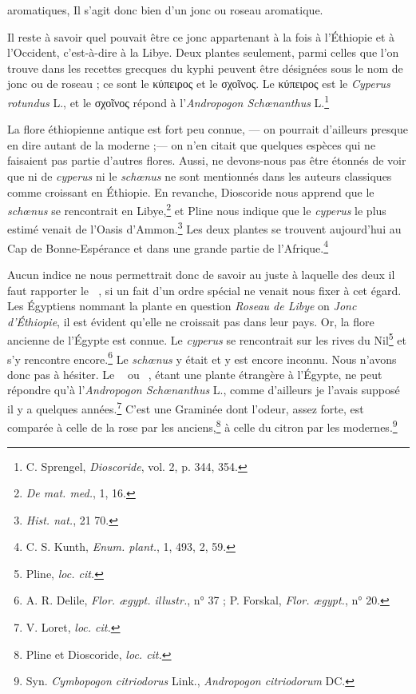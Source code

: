 \documentclass[a4paper, 11pt, oneside, landscape]{article}
\newcommand*\hieroAACM{}
\newcommand*\hieroAAFN{}
\newcommand*\hieroAAFO{\raisebox{0.5ex}{}}
\newcommand*\hieroAAHQ{}
\newcommand*\hieroAAHR{}
\newcommand*\hieroAAUY{}
\begin{document}
aromatiques, Il s'agit donc bien d'un jonc ou roseau aromatique.

Il reste à savoir quel pouvait être ce jonc appartenant à la fois à l'Éthiopie et à l'Occident, c'est-à-dire à la Libye. Deux plantes seulement, parmi celles que l'on trouve dans les recettes grecques du kyphi peuvent être désignées sous le nom de jonc ou de roseau ; ce sont le κύπειρος et le σχοῖνος. Le κύπειρος est le \emph{Cyperus rotundus} L., et le σχοῖνος répond à l'\emph{Andropogon Schœnanthus} L.\footnote{C. Sprengel, \emph{Dioscoride}, vol. 2, p. 344, 354.}

La flore éthiopienne antique est fort peu connue, --- on pourrait d'ailleurs presque en dire autant de la moderne ;--- on n'en citait que quelques espèces qui ne faisaient pas partie d'autres flores. Aussi, ne devons-nous pas être étonnés de voir que ni de \emph{cyperus} ni le \emph{schœnus} ne sont mentionnés dans les auteurs classiques comme croissant en Éthiopie. En revanche, Dioscoride nous apprend que le \emph{schœnus} se rencontrait en Libye,\footnote{\emph{De mat. med.}, 1, 16.} et Pline nous indique que le \emph{cyperus} le plus estimé venait de l'Oasis d'Ammon.\footnote{\emph{Hist. nat.}, 21 70.} Les deux plantes se trouvent aujourd'hui au Cap de Bonne-Espérance et dans une grande partie de l'Afrique.\footnote{C. S. Kunth, \emph{Enum. plant.}, 1, 493, 2, 59.}

Aucun indice ne nous permettrait donc de savoir au juste à laquelle des deux il faut rapporter le $\hieroAACM\:\hieroAAFN\:\hieroAAFO$, si un fait d'un ordre spécial ne venait nous fixer à cet égard. Les Égyptiens nommant la plante en question \emph{Roseau de Libye} on \emph{Jonc d'Éthiopie}, il est évident qu'elle ne croissait pas dans leur pays. Or, la flore ancienne de l'Égypte est connue. Le \emph{cyperus} se rencontrait sur les rives du Nil\footnote{Pline, \emph{loc. cit.}} et s'y rencontre encore.\footnote{A. R. Delile, \emph{Flor. ægypt. illustr.}, n° 37 ; P. Forskal, \emph{Flor. ægypt.}, n° 20.} Le \emph{schœnus} y était et y est encore inconnu. Nous n'avons donc pas à hésiter. Le $\hieroAACM\:\hieroAAFN\:\hieroAAFO$ ou $\hieroAAHQ\:\hieroAAHR\:\hieroAAUY$, étant une plante étrangère à l'Égypte, ne peut répondre qu'à l'\emph{Andropogon Schœnanthus} L., comme d'ailleurs je l'avais supposé il y a quelques années.\footnote{V. Loret, \emph{loc. cit.}} C'est une Graminée dont l'odeur, assez forte, est comparée à celle de la rose par les anciens,\footnote{Pline et Dioscoride, \emph{loc. cit.}} à celle du citron par les modernes.\footnote{Syn. \emph{Cymbopogon citriodorus} Link., \emph{Andropogon citriodorum} DC.}
\end{document}
